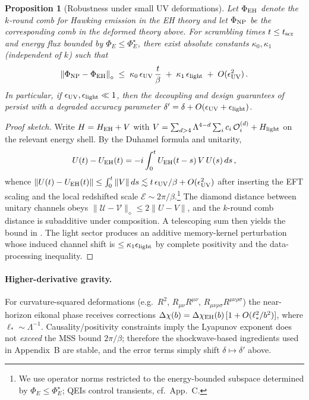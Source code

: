 \documentclass[a4paper,11pt]{article}
\newcommand{\Eflux}{\Phi_E}
\newcommand{\Ddiamond}[1]{\left\|#1\right\|_\diamond}
\theoremstyle{plain}
\newtheorem{proposition}{Proposition}
\theoremstyle{definition}
\theoremstyle{remark}
\begin{document}
\begin{proposition}[Robustness under small UV deformations]\label{prop:robustness-uv}
Let $\Phi_{\rm EH}$ denote the $k$-round comb for Hawking emission in the EH theory and let $\Phi_{\rm NP}$ be the corresponding comb in the deformed theory above. For scrambling times $t\le t_{\rm scr}$ and energy flux bounded by $\Eflux\le \Eflux^{\star}$, there exist absolute constants $\kappa_0,\kappa_1$ (independent of $k$) such that
\begin{equation}
\Ddiamond{\Phi_{\rm NP}-\Phi_{\rm EH}} \;\le\; \kappa_0\,\epsilon_{\rm UV}\,\frac{t}{\beta}\;+\;\kappa_1\,\epsilon_{\rm light}\;+\;O(\epsilon_{\rm UV}^2)\,.
\end{equation}
In particular, if $\epsilon_{\rm UV},\epsilon_{\rm light}\ll 1$, then the decoupling and design guarantees of  persist with a degraded accuracy parameter $\delta'=\delta+O(\epsilon_{\rm UV}+\epsilon_{\rm light})$.
\end{proposition}

\begin{proof}[Proof sketch]
Write $H=H_{\rm EH}+V$ with $V=\sum_{d>4}\Lambda^{4-d}\sum_i c_i\,\mathcal{O}^{(d)}_i + H_{\rm light}$ on the relevant energy shell. By the Duhamel formula and unitarity,
\begin{equation}
U(t)-U_{\rm EH}(t)= -i\int_0^t U_{\rm EH}(t-s)\,V\,U(s)\,ds\,,
\end{equation}
whence $\|U(t)-U_{\rm EH}(t)\|\le \int_0^t \|V\|\,ds \lesssim t\,\epsilon_{\rm UV}/\beta + O(\epsilon_{\rm UV}^2)$ after inserting the EFT scaling and the local redshifted scale $\mathcal{E}\sim 2\pi/\beta$.\footnote{We use operator norms restricted to the energy-bounded subspace determined by $\Eflux\le \Eflux^{\star}$; QEIs control transients, cf.\ App.~C.} The diamond distance between unitary channels obeys $\|\mathcal{U}-\mathcal{V}\|_\diamond\le 2\|U-V\|$, and the $k$-round comb distance is subadditive under composition. A telescoping sum then yields the bound in . The light sector produces an additive memory-kernel perturbation whose induced channel shift is $\le \kappa_1\epsilon_{\rm light}$ by complete positivity and the data-processing inequality.
\end{proof}

\paragraph{Higher-derivative gravity.} For curvature-squared deformations (e.g.\ $R^2$, $R_{\mu\nu}R^{\mu\nu}$, $R_{\mu\nu\rho\sigma}R^{\mu\nu\rho\sigma}$) the near-horizon eikonal phase receives corrections $\Delta\chi(b)=\Delta\chi_{\rm EH}(b)\,[1+O(\ell_\ast^2/b^2)]$, where $\ell_\ast\sim \Lambda^{-1}$. Causality/positivity constraints imply the Lyapunov exponent does not \emph{exceed} the MSS bound $2\pi/\beta$; therefore the shockwave-based ingredients used in Appendix~B are stable, and the error terms simply shift $\delta\mapsto\delta'$ above.
\end{document}
